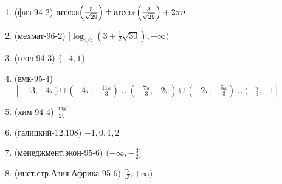 \documentclass[11pt,a5paper]{report}
\begin{document}
\begin{enumerate}

\item (физ-94-2) $\arccos\Bigl(\frac{5}{\sqrt{29}}\Bigr)\pm \arccos\Bigl(\frac{3}{\sqrt{29}}\Bigr)+2\pi n$

\item (мехмат-96-2) $[\log_{4/3}(3+\frac{1}{2}\sqrt{30}),+\infty)$

\item (геол-94-3) $\{-4, 1\}$

\item (вмк-95-4) $[-13, -4\pi)\cup(-4\pi, -\frac{11\pi}{3})\cup(-\frac{7\pi}{3}, -2\pi)\cup(-2\pi, -\frac{5\pi}{3})\cup(-\frac{\pi}{3}, -1]$

\item (хим-94-4) $\frac{228}{25}$

\item (галицкий-12.108) $-1, 0, 1, 2$

\item (менеджмент.экон-95-6) $(-\infty, -\frac{3}{2}]$

\item (инст.стр.Азия.Африка-95-6) $[\frac{2}{3}, +\infty)$

\end{enumerate}
\end{document}
